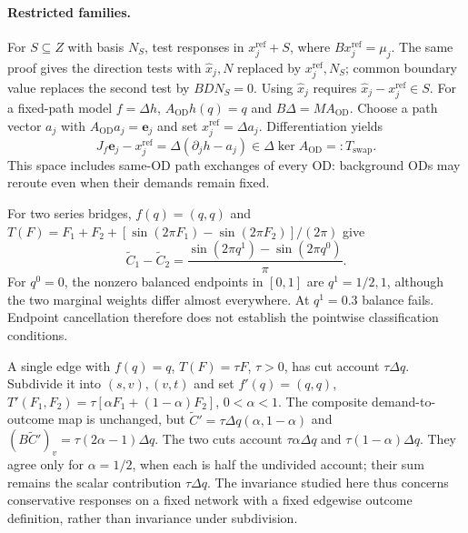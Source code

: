 \paragraph{Restricted families.}\label{app:membership}
For $S\subseteq Z$ with basis $N_S$, test responses in
$x_j^{\mathrm{ref}}+S$, where $Bx_j^{\mathrm{ref}}=\mu_j$.
The same proof gives the direction tests with $\hat x_j,N$ replaced
by $x_j^{\mathrm{ref}},N_S$; common boundary value replaces the second test by
$BDN_S=0$. Using $\hat x_j$ requires
$\hat x_j-x_j^{\mathrm{ref}}\in S$. For a fixed-path model $f=\Delta h$,
$A_{\mathrm{OD}}h(q)=q$ and $B\Delta=MA_{\mathrm{OD}}$. Choose a path
vector $a_j$ with $A_{\mathrm{OD}}a_j=\mathbf e_j$ and set
$x_j^{\mathrm{ref}}=\Delta a_j$. Differentiation yields
\[
J_f\mathbf e_j-x_j^{\mathrm{ref}}
=\Delta(\partial_jh-a_j)\in\Delta\ker A_{\mathrm{OD}}=:T_{\mathrm{swap}}.
\]
This space includes same-OD path exchanges of every OD: background
ODs may reroute even when their demands remain fixed.

\begin{example}\label{ex:cancellation}
For two series bridges, $f(q)=(q,q)$ and
$T(F)=F_1+F_2+[\sin(2\pi F_1)-\sin(2\pi F_2)]/(2\pi)$ give
\[
\widetilde C_1-\widetilde C_2
=\frac{\sin(2\pi q^1)-\sin(2\pi q^0)}{\pi}.
\]
For $q^0=0$, the nonzero balanced endpoints in $[0,1]$ are
$q^1=1/2,1$, although the two marginal weights differ almost
everywhere. At $q^1=0.3$ balance fails. Endpoint cancellation therefore
does not establish the pointwise classification conditions.
\end{example}

\begin{example}\label{ex:subdivision}
A single edge with $f(q)=q$, $T(F)=\tau F$, $\tau>0$, has cut account
$\tau\Delta q$. Subdivide it into $(s,v),(v,t)$ and set
$f'(q)=(q,q)$,
$T'(F_1,F_2)=\tau[\alpha F_1+(1-\alpha)F_2]$, $0<\alpha<1$.
The composite demand-to-outcome map is unchanged, but
$\widetilde C'=\tau\Delta q(\alpha,1-\alpha)$ and
$(B\widetilde C')_v=\tau(2\alpha-1)\Delta q$.
The two cuts account $\tau\alpha\Delta q$ and
$\tau(1-\alpha)\Delta q$. They agree only for $\alpha=1/2$, when each
is half the undivided account; their sum remains the scalar
contribution $\tau\Delta q$. The invariance studied here thus concerns
conservative responses on a fixed network with a fixed edgewise
outcome definition, rather than invariance under subdivision.
\end{example}

